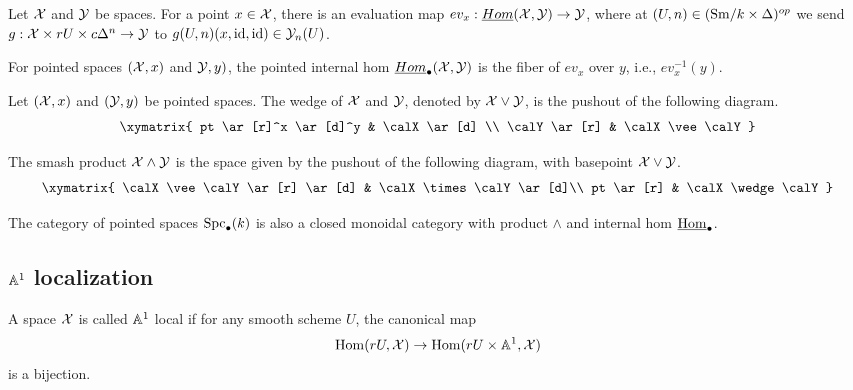\documentclass{amsart}%
\begin{document}
\begin{definition}
  Let $\mathcal{X}$ and $\mathcal{Y}$ be spaces. For a point $x \in \mathcal{X}$, there
  is an evaluation map
  $ev_x : \underline{Hom}(\mathcal{X}, \mathcal{Y}) \to \mathcal{Y}$, where at
  $(U,n) \in (\mathrm{Sm}/k \times \Delta)^{op}$ we send
  $g : \mathcal{X} \times rU \times c\Delta^n \to \mathcal{Y}$ to
  $g(U,n)(x, \operatorname{id}, \operatorname{id}) \in \mathcal{Y}_n(U)$.

  For pointed spaces $(\mathcal{X}, x)$ and $\mathcal{Y}, y)$, the pointed
  internal hom $\underline{Hom}_{\bullet}(\mathcal{X}, \mathcal{Y})$ is the fiber
  of $ev_x$ over $y$, i.e., $ev_{x}^{-1}(y)$.
\end{definition}

\begin{definition}
  Let $(\mathcal{X}, x)$ and $(\mathcal{Y}, y)$ be pointed spaces. The wedge of
  $\mathcal{X}$ and $\mathcal{Y}$, denoted by $\mathcal{X} \vee \mathcal{Y}$, is the pushout
  of the following diagram.
  \begin{equation*}
    \xymatrix{
      pt \ar[r]^x \ar[d]^y & \calX \ar[d] \\
      \calY \ar[r] & \calX \vee \calY
      }
  \end{equation*}

  The smash product $\mathcal{X} \wedge \mathcal{Y}$ is the
  space given by the pushout of the following diagram, with basepoint
  $\mathcal{X} \vee \mathcal{Y}$.
  \begin{equation*}
    \xymatrix{
      \calX \vee \calY \ar[r] \ar[d] & \calX \times \calY \ar[d]\\
      pt \ar[r] & \calX \wedge \calY
      }
  \end{equation*}

\end{definition}


\begin{proposition}
  The category of pointed spaces $\mathrm{Spc}_{\bullet}(k)$ is also a closed
  monoidal category with product $\wedge$ and internal hom
  $\underline{\operatorname{Hom}}_{\bullet}$.
\end{proposition}


\subsection{$\mathbb{A}^1$ localization}

\begin{definition} A space $\mathcal{X}$ is called $\mathbb{A}^1$ local if for any
  smooth scheme $U$, the canonical map
  \begin{equation*}
    \operatorname{Hom}(rU, \mathcal{X}) \to \operatorname{Hom}(rU\times \mathbb{A}^1, \mathcal{X})
  \end{equation*}
  is a bijection. 
\end{definition}
\end{document}
